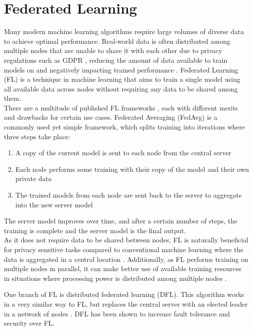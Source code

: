 \section{Federated Learning}
Many modern machine learning algorithms require large volumes of diverse data to achieve optimal performance. Real-world data is often distributed among multiple nodes that are unable to share it with each other due to privacy regulations such as GDPR \cite{gdpr}, reducing the amount of data available to train models on and negatively impacting trained performance \cite{data_volume}. Federated Learning (FL) \cite{survey_on_fed_learning} is a technique in machine learning that aims to train a single model using all available data across nodes without requiring any data to be shared among them. \\

There are a multitude of published FL frameworks \cite{fed_table_survey}, each with different merits and drawbacks for certain use cases. Federated Averaging (FedAvg) \cite{fed_learning} is a commonly used yet simple framework, which splits training into iterations where three steps take place:
\begin{enumerate}
	\item A copy of the current model is sent to each node from the central server
	\item Each node performs some training with their copy of the model and their own private data
	\item The trained models from each node are sent back to the server to aggregate into the new server model
\end{enumerate}
The server model improves over time, and after a certain number of steps, the training is complete and the server model is the final output. \\

As it does not require data to be shared between nodes, FL is naturally beneficial for privacy sensitive tasks compared to conventional machine learning where the data is aggregated in a central location \citeme. Additionally, as FL performs training on multiple nodes in parallel, it can make better use of available training resources in situations where processing power is distributed among multiple nodes \citeme.

One branch of FL is distributed federated learning (DFL). This algorithm works in a very similar way to FL, but replaces the central server with an elected leader in a network of nodes \cite{leaderelec_car}. DFL has been shown to increase fault tolerance and security over FL.


